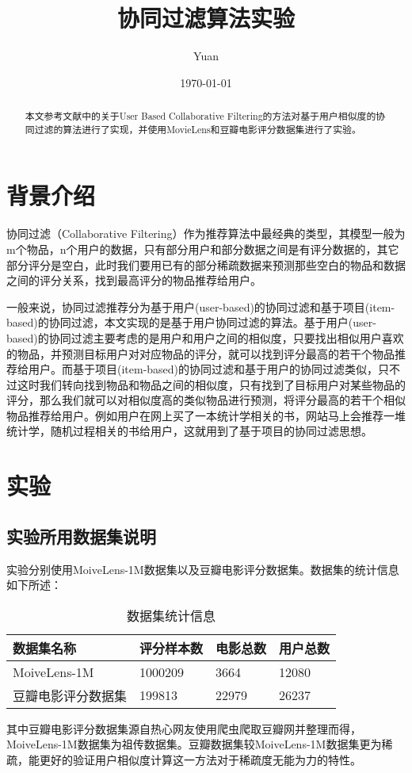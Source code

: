 \documentclass[12pt,a4paper]{ctexart}
\title{协同过滤算法实验}
\author{Yuan}
\date{\small\today}
\begin{document}
\maketitle
\begin{abstract}
本文参考文献\Autocite{Herlocker:1999:AFP:312624.312682}中的关于User Based Collaborative Filtering的方法对基于用户相似度的协同过滤的算法进行了实现，并使用MovieLens\Autocite{moivelens1m_dataset}和豆瓣电影评分数据集\Autocite{douban_dataset}进行了实验。
\end{abstract}	
\section{背景介绍}
协同过滤（Collaborative Filtering）作为推荐算法中最经典的类型，其模型一般为m个物品，n个用户的数据，只有部分用户和部分数据之间是有评分数据的，其它部分评分是空白，此时我们要用已有的部分稀疏数据来预测那些空白的物品和数据之间的评分关系，找到最高评分的物品推荐给用户。

一般来说，协同过滤推荐分为基于用户(user-based)的协同过滤和基于项目(item-based)的协同过滤，本文实现的是基于用户协同过滤的算法。基于用户(user-based)的协同过滤主要考虑的是用户和用户之间的相似度，只要找出相似用户喜欢的物品，并预测目标用户对对应物品的评分，就可以找到评分最高的若干个物品推荐给用户\Autocite{推荐系统实践}。而基于项目(item-based)的协同过滤和基于用户的协同过滤类似，只不过这时我们转向找到物品和物品之间的相似度，只有找到了目标用户对某些物品的评分，那么我们就可以对相似度高的类似物品进行预测，将评分最高的若干个相似物品推荐给用户。例如用户在网上买了一本统计学相关的书，网站马上会推荐一堆统计学，随机过程相关的书给用户，这就用到了基于项目的协同过滤思想。

\section{实验}
\subsection{实验所用数据集说明}
实验分别使用MoiveLens-1M数据集以及豆瓣电影评分数据集。数据集的统计信息如下所述：
\begin{table}[H]
	\centering
	\begin{tabular}{@{}llll@{}}
		\toprule
		数据集名称        & 评分样本数   & 电影总数  & 用户总数  \\ \midrule
		MoiveLens-1M & 1000209 & 3664  & 12080 \\
		豆瓣电影评分数据集    & 199813  & 22979 & 26237 \\ \bottomrule
	\end{tabular}
	\caption{数据集统计信息}
\label{table:dataset}
\end{table}
其中豆瓣电影评分数据集源自热心网友使用爬虫爬取豆瓣网并整理而得，MoiveLens-1M数据集为祖传数据集。豆瓣数据集较MoiveLens-1M数据集更为稀疏，能更好的验证用户相似度计算这一方法对于稀疏度无能为力的特性。
\end{document}

